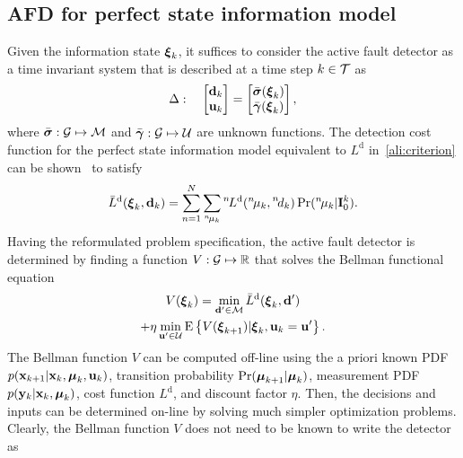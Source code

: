 \documentclass[conference,10pt]{IEEEtran}
\def\nth{\prescript{n\!}{}}
\begin{document}
\subsection{AFD for perfect state information model}\label{sec:afdPerfectStateInformationModel}
Given the information state $\boldsymbol{\xi}_{k}$, it suffices to consider the active fault detector as a time invariant system that is described at a time step $k\in\mathcal{T}$ as
\begin{align}
  \Delta:\quad
  \begin{bmatrix}
    \mathbf{d}_{k}\\ \mathbf{u}_{k}
  \end{bmatrix} =
  \begin{bmatrix}
    \bar{\boldsymbol{\sigma}}(\boldsymbol{\xi}_{k})\\ \bar{\boldsymbol{\gamma}}(\boldsymbol{\xi}_{k})
  \end{bmatrix},
\end{align}
where $\bar{\boldsymbol{\sigma}}:\mathcal{G}\mapsto\mathcal{M}$ and $\bar{\boldsymbol{\gamma}}:\mathcal{G}\mapsto\mathcal{U}$ are unknown functions. 
The detection cost function for the perfect state information model equivalent to $L^{\mathrm{d}}$ in~\eqref{ali:criterion} can be shown~\cite{Puncochar2014:ja:AMCS} to satisfy 
\begin{align}\label{ali:detection_cost_function}
  \bar{L}^{\mathrm{d}}(\bfxi_{k},\bfd_{k}) = 
    \sum_{n=1}^N\sum_{\nth{\mu}_{k}}
    \nth{L}^{\mathrm{d}}(\nth{\mu}_{k},\nth{d}_{k})\Pr(\nth{\mu}_{k} \vert \bfI_{0}^{k}).
\end{align}
Having the reformulated problem specification, the active fault detector is determined by finding a function $V:\mathcal{G}\mapsto\mathbb{R}$ that solves the Bellman functional equation~\cite{Bertsekas2012:b,Vrabie2013:b}
\begin{multline} \label{ali:BellmanFunctionalEquation}
   V(\boldsymbol{\xi}_{k}) = \min_{\mathbf{d}'\in\mathcal{M}} \bar{L}^{\mathrm{d}}(\boldsymbol{\xi}_{k},\mathbf{d}')\\
  +\eta\min_{\mathbf{u}'\in\mathcal{U}} \operatorname*{E} \left\{ V(\boldsymbol{\xi}_{k+1}) \vert
  \boldsymbol{\xi}_{k},\mathbf{u}_k=\mathbf{u}' \right\}.
\end{multline}
The Bellman function $V$ can be computed off-line using the a priori known PDF $p ( \mathbf{x}_{k+1} \vert \mathbf{x}_{k},\boldsymbol{\mu}_{k},\mathbf{u}_{k} )$, transition probability $\Pr(\boldsymbol{\mu}_{k+1} \vert \boldsymbol{\mu}_{k})$, measurement PDF $p(\mathbf{y}_k\vert \mathbf{x}_k,\boldsymbol{\mu}_k)$, cost function $L^{\mathrm{d}}$, and discount factor $\eta$. 
Then, the decisions and  inputs can be determined on-line by solving much simpler optimization problems. 
Clearly, the Bellman function $V$ does not need to be known to write the detector as
\end{document}
